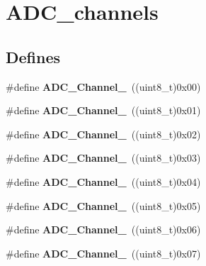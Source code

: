 \hypertarget{group__ADC__channels}{
\section{ADC\_\-channels}
\label{group__ADC__channels}
}
\subsection*{Defines}
\begin{DoxyCompactItemize}
\item 
\hypertarget{group__ADC__channels_ga40ec353803e9470a5721ef5bf0b1ab24}{
\#define {\bfseries ADC\_\-Channel\_}~((uint8\_\-t)0x00)}
\label{group__ADC__channels_ga40ec353803e9470a5721ef5bf0b1ab24}

\item 
\hypertarget{group__ADC__channels_ga0b04cebf8d62085eca6dc7daa3d5d3f0}{
\#define {\bfseries ADC\_\-Channel\_}~((uint8\_\-t)0x01)}
\label{group__ADC__channels_ga0b04cebf8d62085eca6dc7daa3d5d3f0}

\item 
\hypertarget{group__ADC__channels_gabc66e2529583e11b591efd2df7070571}{
\#define {\bfseries ADC\_\-Channel\_}~((uint8\_\-t)0x02)}
\label{group__ADC__channels_gabc66e2529583e11b591efd2df7070571}

\item 
\hypertarget{group__ADC__channels_ga9f93cbacd030f1c79f96f8889b0cdee6}{
\#define {\bfseries ADC\_\-Channel\_}~((uint8\_\-t)0x03)}
\label{group__ADC__channels_ga9f93cbacd030f1c79f96f8889b0cdee6}

\item 
\hypertarget{group__ADC__channels_gafc7218417f729659dd8f06185cc2eafa}{
\#define {\bfseries ADC\_\-Channel\_}~((uint8\_\-t)0x04)}
\label{group__ADC__channels_gafc7218417f729659dd8f06185cc2eafa}

\item 
\hypertarget{group__ADC__channels_ga42822abae41faabde2a2da877e0cc854}{
\#define {\bfseries ADC\_\-Channel\_}~((uint8\_\-t)0x05)}
\label{group__ADC__channels_ga42822abae41faabde2a2da877e0cc854}

\item 
\hypertarget{group__ADC__channels_ga7e24a73eec4aeb7d8e2f9008825ceacb}{
\#define {\bfseries ADC\_\-Channel\_}~((uint8\_\-t)0x06)}
\label{group__ADC__channels_ga7e24a73eec4aeb7d8e2f9008825ceacb}

\item 
\hypertarget{group__ADC__channels_ga9723aa5fe6b9f4af1ffd3b90e6eef8d1}{
\#define {\bfseries ADC\_\-Channel\_}~((uint8\_\-t)0x07)}
\label{group__ADC__channels_ga9723aa5fe6b9f4af1ffd3b90e6eef8d1}


\end{DoxyCompactItemize}
